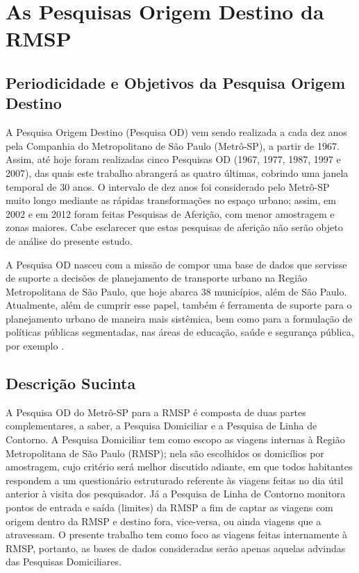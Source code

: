 \chapter{As Pesquisas Origem Destino da RMSP}\label{chap:pesquisa-od}

\section{Periodicidade e Objetivos da Pesquisa Origem Destino}\label{sec:period-obj}

A Pesquisa Origem Destino (Pesquisa OD) vem sendo realizada a cada dez anos pela Companhia do Metropolitano de São Paulo (Metrô-SP), a partir de 1967. Assim, até hoje foram realizadas cinco Pesquisas OD (1967, 1977, 1987, 1997 e 2007), das quais este trabalho abrangerá as quatro últimas, cobrindo uma janela temporal de 30 anos. O intervalo de dez anos foi considerado pelo Metrô-SP muito longo mediante as rápidas transformações no espaço urbano; assim, em 2002 e em 2012 foram feitas Pesquisas de Aferição, com menor amostragem e zonas maiores. Cabe esclarecer que estas pesquisas de aferição não serão objeto de análise do presente estudo.

A Pesquisa OD nasceu com a missão de compor uma base de dados que servisse de suporte a decisões de planejamento de transporte urbano na Região Metropolitana de São Paulo, que hoje abarca 38 municípios, além de São Paulo. Atualmente, além de cumprir esse papel, também é ferramenta de suporte para o planejamento urbano de maneira mais sistêmica, bem como para a formulação de políticas públicas segmentadas, nas áreas de educação, saúde e segurança pública, por exemplo \cite{MANUALOD2007}.

\section{Descrição Sucinta}\label{sec:descr}

A Pesquisa OD do Metrô-SP para a RMSP é composta de duas partes complementares, a saber, a Pesquisa Domiciliar e a Pesquisa de Linha de Contorno. A Pesquisa Domiciliar tem como escopo as viagens internas à Região Metropolitana de São Paulo (RMSP); nela são escolhidos os domicílios por amostragem, cujo critério será melhor discutido adiante, em que todos habitantes respondem a um questionário estruturado referente às viagens feitas no dia útil anterior à visita dos pesquisador. Já a Pesquisa de Linha de Contorno monitora pontos de entrada e saída (limites) da RMSP a fim de captar as viagens com origem dentro da RMSP e destino fora, vice-versa, ou ainda viagens que a atravessam. O presente trabalho tem como foco as viagens feitas internamente à RMSP, portanto, as bases de dados consideradas serão apenas aquelas advindas das Pesquisas Domiciliares.

